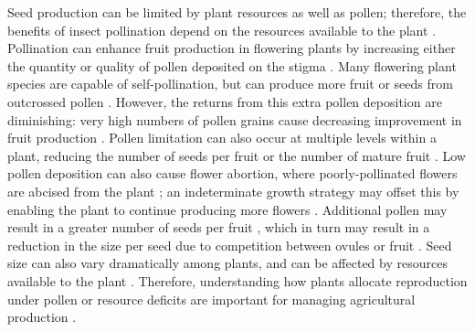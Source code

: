 \documentclass[12pt]{article} %
\begin{document}
Seed production can be limited by plant resources as well as pollen; therefore, the benefits of insect pollination depend on the resources available to the plant \citep{stephenson1981, marini2015, tamburini2017, tamburini2019}.
Pollination can enhance fruit production in flowering plants by increasing either the quantity or quality of pollen deposited on the stigma \citep{stephenson1981, burd1994, aizen2007}.
Many flowering plant species are capable of self-pollination, but can produce more fruit or seeds from outcrossed pollen \citep{knight2005}.
However, the returns from this extra pollen deposition are diminishing: very high numbers of pollen grains cause decreasing improvement in fruit production \citep{plowright1981,ashman2004, harder2016}.
Pollen limitation can also occur at multiple levels within a plant, reducing the number of seeds per fruit or the number of mature fruit \citep{burd1994}.
Low pollen deposition can also cause flower abortion, where poorly-pollinated flowers are abcised from the plant \citep{stephenson1981}; an indeterminate growth strategy may offset this by enabling the plant to continue producing more flowers \citep{doust1982, lawrence1993, sabbahi2006, bos2007}.
Additional pollen may result in a greater number of seeds per fruit \citep{knight2006}, which in turn may result in a reduction in the size per seed due to competition between ovules or fruit \citep{free1968, mazer1987}.
Seed size can also vary dramatically among plants, and can be affected by resources available to the plant \citep{mazer1987, venable1992}. 
Therefore, understanding how plants allocate reproduction under pollen or resource deficits are important for managing agricultural production \citep{bos2007, tamburini2019}.
\end{document}
